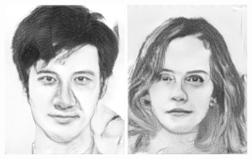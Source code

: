 \documentclass[10pt,twocolumn,letterpaper]{article}
\begin{document}
\begin{figure}[htbp]
{\begin{minipage}[b]{0.22\linewidth}
\includegraphics[width=0.99\linewidth]{img/real_world_photos/ours_r2.png}
\includegraphics[width=0.99\linewidth]{img/real_world_photos/ours_r3.png}

\end{minipage}}
\end{figure}
\end{document}
